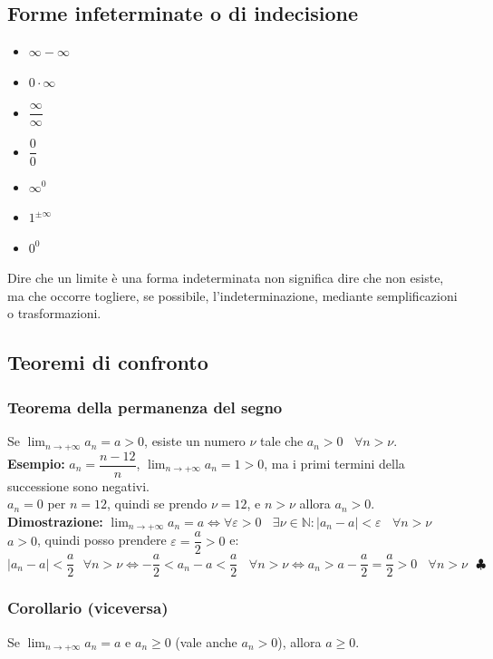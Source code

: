 \documentclass{article}
\begin{document}
\subsection{Forme infeterminate o di indecisione}
\begin{itemize}
    \item $\infty - \infty$
    \item $0 \cdot \infty$
    \item $\dfrac{\infty}{\infty}$
    \item $\dfrac{0}{0}$
    \item $\infty^0$
    \item $1^{\pm\infty}$
    \item $0^0$
\end{itemize}
Dire che un limite è una forma indeterminata non significa dire che non esiste, ma che occorre togliere, se possibile, l'indeterminazione, mediante semplificazioni o trasformazioni.
\subsection{Teoremi di confronto}
\subsubsection{Teorema della permanenza del segno}
Se $\lim_{n\to+\infty} a_n = a > 0$, esiste un numero $\nu$ tale che $a_n > 0 \
    \ \ \ \forall n > \nu$.\\ \textbf{Esempio:} $a_n = \dfrac{n-12}{n}$,
$\lim_{n\to+\infty} a_n = 1 > 0$, ma i primi termini della successione sono
negativi.\\ $a_n = 0$ per $n = 12$, quindi se prendo $\nu = 12$, e $n > \nu$
allora $a_n > 0$.\\ \textbf{Dimostrazione:} $\lim_{n\to+\infty} a_n = a \iff
    \forall\varepsilon>0 \ \ \ \ \exists\nu\in\mathbb{N} : |a_n - a| < \varepsilon
    \ \ \ \ \forall n > \nu$\\ $a > 0$, quindi posso prendere $\varepsilon =
    \dfrac{a}{2} > 0$ e:
\[
    |a_n - a| < \dfrac{a}{2} \ \ \ \forall n > \nu \iff -\dfrac{a}{2} < a_n - a < \dfrac{a}{2} \ \ \ \ \forall n > \nu \iff a_n > a - \dfrac{a}{2} = \dfrac{a}{2} > 0 \ \ \ \ \forall n > \nu \ \ \ \clubsuit
\]
\subsubsection*{Corollario (viceversa)}
Se $\lim_{n\to+\infty} a_n = a$ e $a_n \geq 0$ (vale anche $a_n > 0$), allora
$a \geq 0$.
\end{document}
